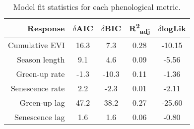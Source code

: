 \begin{table}[H]
\centering
\begin{tabular}{rcccc}
  \hline
Response & $\delta$AIC & $\delta$BIC & R\textsuperscript{2}\textsubscript{adj} & $\delta$logLik \\ 
  \hline
Cumulative EVI & 16.3 & 7.3 & 0.28 & -10.15 \\ 
  Season length & 9.1 & 4.6 & 0.09 & -5.56 \\ 
  Green-up rate & -1.3 & -10.3 & 0.11 & -1.36 \\ 
  Senescence rate & 2.2 & -2.3 & 0.01 & -2.11 \\ 
  Green-up lag & 47.2 & 38.2 & 0.27 & -25.60 \\ 
  Senescence lag & 1.6 & 1.6 & 0.06 & -0.80 \\ 
   \hline
\end{tabular}
\caption{Model fit statistics for each phenological metric.} 
\label{mod_stat}
\end{table}

